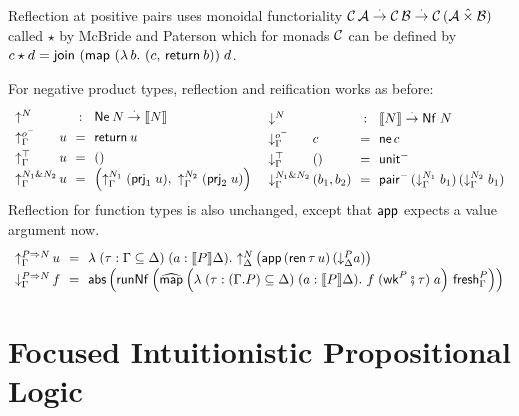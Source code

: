 \documentclass[a4paper,USenglish,cleveref, autoref]{lipics-v2019}
\begin{document}
Reflection at positive pairs uses monoidal functoriality
$\mathcal{C}\,\mathcal{A} \stackrel{\cdot}{\to} \mathcal{C}\,\mathcal{B} \stackrel{\cdot}{\to} \mathcal{C}\,(\mathcal{A} \mathbin{\hat\times} \mathcal{B})$
called $\star$ by McBride and Paterson \cite[Section 7]{mcbridePaterson:applicative}
which for monads $\mathcal{C}$ can be defined by
$c \star d = \mathsf{join}^{} \; (\mathsf{map}^{}\;(\lambda\,b.\ (c,\, \mathsf{return}^{}\,b))\;d$.

For negative product types, reflection and reification works as before:
\[
\def\arraystretch{1.3}
\begin{array}{l@{\,}l@{~~}c@{~~}l}
  \multicolumn 2 l {\up N} & : & \tNe\,N \todot \den N \\
  \upG \natom & u & = & \treturn\,u \\
  \upG \top   & u & = & \ttempty \\
  \upG {N_1 \ntimes N_2} & u & = & \left(
    \upG {N_1} \; (\prj 1 u)
    ,\
    \upG {N_2} \; (\prj 2 u)
    \right) \\
\end{array}
\
\begin{array}{l@{\,}l@{~~}c@{~~}l}
  \multicolumn 2 l {\down N} & : & \den N \todot \tNf\;N \\
  \downG \natom & c  & = & \tne\,c \\
  \downG \top   & () & = & \nunit \\
  \downG {N_1 \ntimes N_2} & (b_1,b_2) & = & \npair
    \, (\downG {N_1} \; b_1)
    \, (\downG {N_2} \; b_1)
    \\
\end{array}
\]
Reflection for function types is also unchanged, except that $\mathsf{app}$
expects a value argument now.
\[
\def\arraystretch{1.3}
\begin{array}{l@{\,}l@{~~}c@{~~}l}
  \upG {P \To N} & u & = & \lambda
    \;(\tau : \Gamma \sublist \Delta)
    \;(a : \den P \Delta)
    . \
    \up[\Delta] N \left( \tapp\,(\tren\,\tau\,u)\,(\down[\Delta] P a) \right)
    \\
  \downG {P \To N} & f & = & \tabs \left( \trunNf \left(
    \stmap
      \left(
        \lambda
          \;(\tau : (\cext \Gamma P) \sublist \Delta)
          \;(a : \den P \Delta)
          . \
          f\; (\twk^P \rcomp \tau)\; a
        \right)
      \,\tfresh^P_\Gamma
    \right) \right)
    \\
\end{array}
\]




\section{Focused Intuitionistic Propositional Logic}
\label{sec:fipl}
\end{document}
